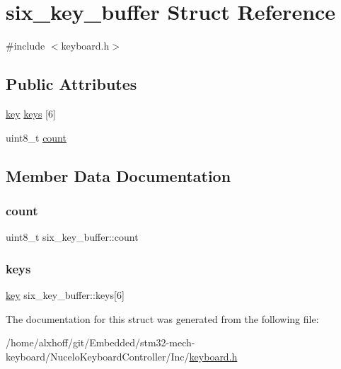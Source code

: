 \hypertarget{structsix__key__buffer}{}\section{six\+\_\+key\+\_\+buffer Struct Reference}
\label{structsix__key__buffer}


{\ttfamily \#include $<$keyboard.\+h$>$}

\subsection*{Public Attributes}
\begin{DoxyCompactItemize}
\item 
\hyperlink{structkey}{key} \hyperlink{structsix__key__buffer_a705e842e740f5bb4100f2b2a968cfba9}{keys} \mbox{[}6\mbox{]}
\item 
uint8\+\_\+t \hyperlink{structsix__key__buffer_a11703a2763f95be8e14f51bdac78c0eb}{count}
\end{DoxyCompactItemize}


\subsection{Member Data Documentation}
\mbox{\label{structsix__key__buffer_a11703a2763f95be8e14f51bdac78c0eb}} 
\subsubsection{\texorpdfstring{count}{count}}
{\footnotesize\ttfamily uint8\+\_\+t six\+\_\+key\+\_\+buffer\+::count}

\mbox{\label{structsix__key__buffer_a705e842e740f5bb4100f2b2a968cfba9}} 
\subsubsection{\texorpdfstring{keys}{keys}}
{\footnotesize\ttfamily \hyperlink{structkey}{key} six\+\_\+key\+\_\+buffer\+::keys\mbox{[}6\mbox{]}}



The documentation for this struct was generated from the following file\+:\begin{DoxyCompactItemize}
\item 
/home/alxhoff/git/\+Embedded/stm32-\/mech-\/keyboard/\+Nucelo\+Keyboard\+Controller/\+Inc/\hyperlink{keyboard_8h}{keyboard.\+h}\end{DoxyCompactItemize}
